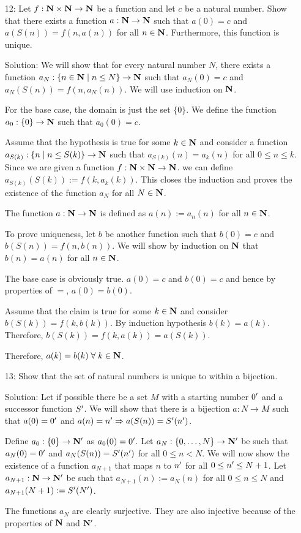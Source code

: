 \begin{enumerate}
\item[12:] Let $f: \mathbf{N} \times \mathbf{N} \rightarrow \mathbf{N}$ be a function and 
let $c$ be a natural number. Show that there exists a function $a: \mathbf{N} 
\rightarrow \mathbf{N}$ such that $a(0) = c$ and $a(S(n)) = f(n, a(n))$ for all
$n \in \mathbf{N}$. Furthermore, this function is unique.
\item[Solution:] We will show that for every natural number $N$, there
exists a function $a_N : \{n \in \mathbf{N} \;|\; n \le N\} \rightarrow \mathbf{N}$
such that $a_N(0) = c$ and $a_N(S(n)) = f(n, a_N(n))$. We will use 
induction on $\mathbf{N}$.

For the base case, the domain is just the set $\{0\}$. We define the
function $a_0: \{0\} \rightarrow \mathbf{N}$ such that $a_0(0) = c$.

Assume that the hypothesis is true for some $k \in \mathbf{N}$ and consider a
function $a_{S(k)} : \{n \;|\; n \le S(k)\} \rightarrow \mathbf{N}$ such that
$a_{S(k)}(n) = a_k(n)$ for all $0 \le n \le k$. Since we are given a 
function $f: \mathbf{N} \times \mathbf{N} \rightarrow \mathbf{N}$. we can define $a_{S(k)}(
S(k)) := f(k, a_k(k))$. This closes the induction and proves the existence
of the function $a_N$ for all $N \in \mathbf{N}$. 

The function $a : \mathbf{N} \rightarrow \mathbf{N}$ is defined as $a(n) := a_n(n)$
for all $n \in \mathbf{N}$.

To prove uniqueness, let $b$ be another function such that $b(0) = c$ and
$b(S(n)) = f(n, b(n))$. We will show by induction on $\mathbf{N}$ that $b(n) =
a(n)$ for all $n \in \mathbf{N}$.

The base case is obviously true. $a(0) = c$ and $b(0) = c$ and hence by
properties of $=$, $a(0) = b(0)$.

Assume that the claim is true for some $k \in \mathbf{N}$ and consider $b(S(k))
= f(k, b(k))$. By induction hypothesis $b(k) = a(k)$. Therefore, $b(S(k))
= f(k, a(k)) = a(S(k))$. 

Therefore, $a(k) = b(k) \;\forall\; k \in \mathbf{N}$.

\item[13:] Show that the set of natural numbers is unique to within a 
bijection.
\item[Solution:] Let if possible there be a set $M$ with a starting
number $0^\prime$ and a successor function $S^\prime$. We will show that there
is a bijection $a: N \rightarrow M$ such that $a(0) = 0^\prime$ and $a(n) =
n^\prime \Rightarrow a(S(n)) = S^\prime(n^\prime)$.

Define $a_0: \{0\} \rightarrow \mathbf{N}^\prime$ as $a_0(0) = 0^\prime$. Let $a_N:
\{0, \ldots, N\} \rightarrow \mathbf{N}^\prime$ be such that $a_N(0) = 0^\prime$ and
$a_N(S(n)) = S^\prime(n^\prime)$ for all $0 \le n < N$. We will now 
show the existence of a function $a_{N+1}$ that maps $n$ to $n^\prime$ for 
all $0 \le n^\prime \le N + 1$. Let $a_{N+1}:\mathbf{N} \rightarrow \mathbf{N}^\prime$ be
such that $a_{N+1}(n) := a_N(n)$ for all $0 \le n \le N$ and $a_{N+1}(N+1)
:= S^\prime(N^\prime)$.

The functions $a_N$ are clearly surjective. They are also injective because
of the properties of $\mathbf{N}$ and $\mathbf{N}^\prime$.
\end{enumerate}

